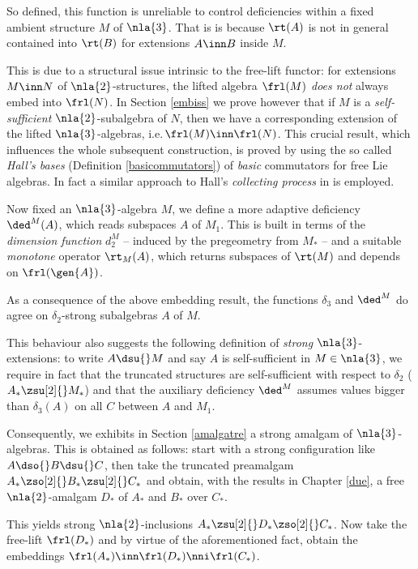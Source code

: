 So defined, this function is unreliable to control deficiencies within a fixed ambient structure $M$ of $\nla{3}$. That is
is because $\rt(A)$ is not in general contained into $\rt(B)$ for extensions $A\inn B$ inside $M$.

\smallskip
This is due to a structural issue intrinsic to the free-lift functor:
for extensions $M\inn N$ of $\nla{2}$-structures, the lifted algebra $\frl(M)$ {\em does not} always embed into $\frl(N)$.
In Section \ref{embiss} we prove however that if $M$ is a {\em self-sufficient} $\nla{2}$-subalgebra of $N$, then
we have a corresponding extension of the lifted $\nla{3}$-algebras, i.e.\,$\frl(M)\inn\frl(N)$.
This crucial result, which influences the whole subsequent construction,
is proved by using the so called {\em Hall's bases} (Definition \ref{basicommutators}) of {\em basic} commutators
for free Lie algebras. In fact a similar approach to Hall's {\em collecting process} in \cite{mhalll} is employed.

\smallskip
Now fixed an $\nla{3}$-algebra $M$, we define a more adaptive deficiency $\ded^{M}(A)$, which reads subspaces $A$ of
$M_{1}$. This is built in terms of the {\em dimension function} $d_{2}^{M}$ -- induced by the pregeometry from $M_{*}$ -- and a
suitable {\em monotone} operator $\rt_{M}(A)$, which returns subspaces of $\rt(M)$ and depends on $\frl(\gen{A})$. %

As a consequence of the above embedding result, the functions $\delta_{3}$ and $\ded^{M}$ do agree
on $\delta_{2}$-strong subalgebras $A$ of $M$.

This behaviour also suggests the following definition of {\em strong} $\nla{3}$-extensions: to write $A\dsu{} M$ and
say $A$ is self-sufficient in $M\in\nla{3}$, we require in fact that the truncated
structures are
self-sufficient with respect to $\delta_{2}$ ($A_{*}\zsu[2]{}M_{*}$) and that the auxiliary deficiency $\ded^{M}$ assumes values
bigger than $\delta_{3}(A)$ on all $C$ between $A$ and $M_{1}$.

\smallskip
Consequently, we exhibits in Section \ref{amalgatre} a strong amalgam of $\nla{3}$-algebras.
This is obtained as follows: start with a strong configuration like $A\dso{}B\dsu{}C$, then
take the truncated preamalgam $A_{*}\zso[2]{}B_{*}\zsu[2]{}C_{*}$ and obtain, with the results in Chapter \ref{due},
a free $\nla{2}$-amalgam $D_{*}$ of $A_{*}$ and $B_{*}$ over $C_{*}$.

This yields strong $\nla{2}$-inclusions $A_{*}\zsu[2]{}D_{*}\zso[2]{}C_{*}$. Now take the free-lift $\frl(D_{*})$ and by virtue of the aforementioned fact, obtain the embeddings $\frl(A_{*})\inn \frl(D_{*}) \nni \frl(C_{*})$.

